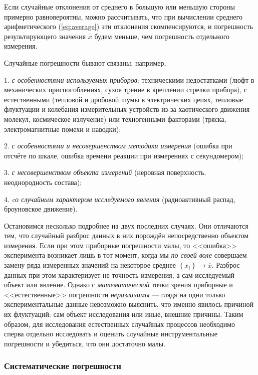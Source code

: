 \documentclass[10pt]{article}
\begin{document}
Если случайные отклонения от среднего в большую или меньшую стороны
примерно равновероятны, можно рассчитывать, что при вычислении среднего
арифметического (\ref{eq:average}) эти отклонения скомпенсируются,
и погрешность результирующего значения $\overline{x}$ будем меньше,
чем погрешность отдельного измерения.

Случайные погрешности бывают связаны, например,

1. \emph{с особенностями используемых приборов}: техническими недостатками
(люфт в механических приспособлениях, сухое трение в креплении стрелки
прибора), с естественными (тепловой и дробовой шумы в электрических
цепях, тепловые флуктуации и колебания измерительных устройств из-за
хаотического движения молекул, космическое излучение) или техногенными
факторами (тряска, электромагнитные помехи и наводки);

2. \emph{с особенностями и несовершенством методики измерения} (ошибка
при отсчёте по шкале, ошибка времени реакции при измерениях с секундомером);

3. \emph{с несовершенством объекта измерений} (неровная поверхность,
неоднородность состава);

4. \emph{cо случайным характером исследуемого явления} (радиоактивный
распад, броуновское движение).

Остановимся несколько подробнее на двух последних случаях. Они отличаются
тем, что случайный разброс данных в них порождён непосредственно объектом
измерения. Если при этом приборные погрешности малы, то <<ошибка>>
эксперимента возникает лишь в тот момент, когда мы \emph{по своей
воле} совершаем замену ряда измеренных значений на некоторое среднее
$\left\{ x_{i}\right\} \to\overline{x}$. Разброс данных при этом
характеризует не точность измерения, а сам исследуемый объект или
явление. Однако с \emph{математической} точки зрения приборные и <<естественные>>
погрешности \emph{неразличимы} --- глядя на одни только
экспериментальные данные невозможно выяснить, что именно явилось причиной
их флуктуаций: сам объект исследования или иные, внешние причины.
Таким образом, для исследования естественных случайных процессов необходимо
сперва отдельно исследовать и оценить случайные инструментальные погрешности
и убедиться, что они достаточно малы.

\subsubsection{Систематические погрешности}
\end{document}

